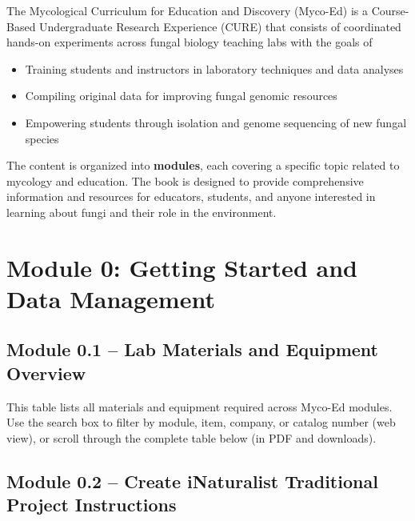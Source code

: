 \documentclass[
  letterpaper,
  DIV=11,
  numbers=noendperiod]{scrreprt}
\providecommand{\tightlist}{%
  \setlength{\itemsep}{0pt}\setlength{\parskip}{0pt}}
\begin{document}
The Mycological Curriculum for Education and Discovery (Myco-Ed) is a
Course-Based Undergraduate Research Experience (CURE) that consists of
coordinated hands-on experiments across fungal biology teaching labs
with the goals of

\begin{itemize}
\tightlist
\item
  Training students and instructors in laboratory techniques and data
  analyses
\item
  Compiling original data for improving fungal genomic resources
\item
  Empowering students through isolation and genome sequencing of new
  fungal species
\end{itemize}

The content is organized into \textbf{modules}, each covering a specific
topic related to mycology and education. The book is designed to provide
comprehensive information and resources for educators, students, and
anyone interested in learning about fungi and their role in the
environment.


\chapter*{Module 0: Getting Started and Data
Management}\label{module-0-getting-started-and-data-management}


\section*{Module 0.1 -- Lab Materials and Equipment
Overview}\label{module-0.1-lab-materials-and-equipment-overview}


This table lists all materials and equipment required across Myco-Ed
modules. Use the search box to filter by module, item, company, or
catalog number (web view), or scroll through the complete table below
(in PDF and downloads).

\section*{Module 0.2 -- Create iNaturalist Traditional Project
Instructions}\label{module-0.2-create-inaturalist-traditional-project-instructions}
\end{document}
